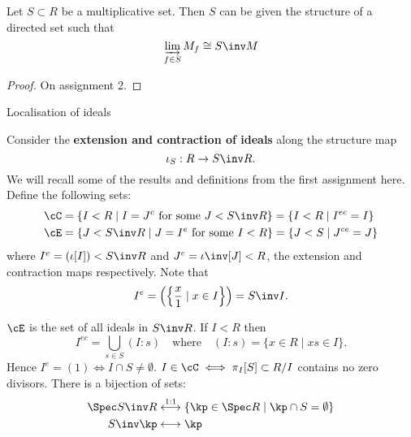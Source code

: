 \begin{prop}[2.12]
  Let $S \subset R$ be a multiplicative set.
  Then $S$ can be given the structure of a directed set such that
  \[\varinjlim_{f \in S} M_f \cong S\inv M\]
\end{prop}

\begin{proof}
  On assignment 2.
\end{proof}

Localisation of ideals

\begin{defn}
  Consider the \textbf{extension and contraction of ideals} along the structure map
  \[\iota_S: R \to S\inv R.\]
  We will recall some of the results and definitions from the first assignment here.
  Define the following sets:
  \begin{align*}
    \cC &= \left\{ I<R \mid I = J^c \text{ for some } J<S\inv R \right\} = \left\{ I<R \mid I^{ec}=I \right\} \\
    \cE &= \left\{ J<S\inv R \mid J = I^e \text{ for some } I<R \right\} = \left\{ J<S \mid J^{ce}=J \right\}
  \end{align*}
  where $I^e = (\iota[I]) < S\inv R$ and $J^c = \iota\inv[J]<R$, the extension and contraction maps respectively.
  Note that
  \[I^e = \left( \left\{ \frac{x}{1} \mid x \in I \right\} \right) = S\inv I.\]
\end{defn}

\begin{prop}[2.13]
  \leavevmode
  \begin{enum}
    \io $\cE$ is the set of all ideals in $S\inv R$.
    \io If $I<R$ then
    \[I^{ec} = \bigcup_{s \in S} (I:s) \quad\text{where}\quad (I:s) = \{ x \in R \mid xs \in I \}.\]
    Hence $I^e=(1) \iff I \cap S \neq \emptyset$.
    \io $I \in \cC \iff \pi_I[S] \subset R/I$ contains no zero divisors.
    \io There is a bijection of sets:
    \begin{align*}
      \Spec S\inv R &\overset{1:1}{\longleftrightarrow} \left\{ \kp \in \Spec R \mid \kp \cap S = \emptyset \right\} \\
      S\inv \kp &\longleftrightarrow \kp
    \end{align*}
  \end{enum}
\end{prop}

